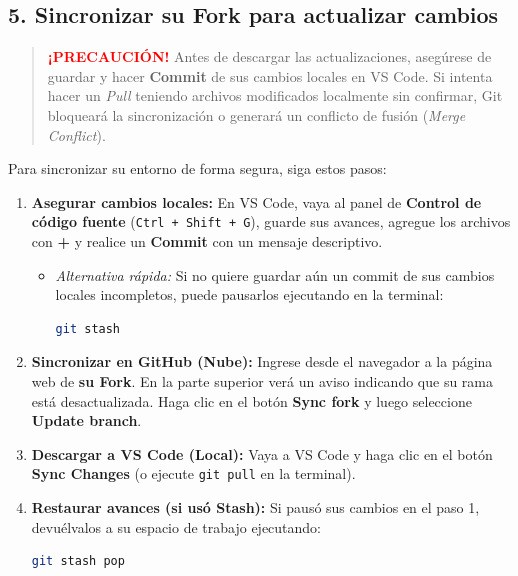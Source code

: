 \documentclass[12pt]{article}
\begin{document}
\subsection*{5. Sincronizar su Fork para actualizar cambios}

\begin{quote}
\textbf{\textcolor{red}{¡PRECAUCIÓN!}} Antes de descargar las actualizaciones, 
asegúrese de guardar y hacer \textbf{Commit} de sus cambios locales en VS Code. 
Si intenta hacer un \emph{Pull} teniendo archivos modificados localmente sin confirmar, 
Git bloqueará la sincronización o generará un conflicto de fusión (\emph{Merge Conflict}).
\end{quote}

Para sincronizar su entorno de forma segura, siga estos pasos:

\begin{enumerate}[label=\arabic*)]
    \item \textbf{Asegurar cambios locales:} En VS Code, vaya al panel de 
    \textbf{Control de código fuente} (\lstinline|Ctrl + Shift + G|), guarde sus avances, 
    agregue los archivos con \textbf{+} y realice un \textbf{Commit} con un mensaje descriptivo. 
    \begin{itemize}
        \item \emph{Alternativa rápida:} Si no quiere guardar aún un commit de sus cambios locales incompletos, puede pausarlos ejecutando en la terminal:
\begin{lstlisting}[language=bash]
git stash
\end{lstlisting}
    \end{itemize}

    \item \textbf{Sincronizar en GitHub (Nube):} Ingrese desde el navegador a la página web de \textbf{su Fork}. En la parte superior verá un aviso indicando que su rama está desactualizada. Haga clic en el botón \textbf{Sync fork} y luego seleccione \textbf{Update branch}.

    \item \textbf{Descargar a VS Code (Local):} Vaya a VS Code y haga clic en el botón \textbf{Sync Changes} (o ejecute \lstinline|git pull| en la terminal).

    \item \textbf{Restaurar avances (si usó Stash):} Si pausó sus cambios en el paso 1, devuélvalos a su espacio de trabajo ejecutando:
\begin{lstlisting}[language=bash]
git stash pop
\end{lstlisting}
\end{enumerate}
\end{document}
